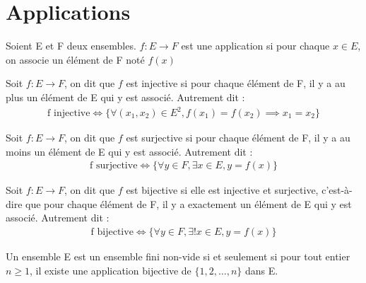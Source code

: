\section{Applications}
\begin{definitionbox}
    \begin{definition}[Application]
	Soient E et F deux ensembles. $f:E \to F$ est une application si pour chaque $x \in E$, on associe un élément de F noté $f(x)$
\end{definition}
\end{definitionbox}

\begin{definitionbox}
    \begin{definition}[Injectivité]
	Soit $f:E \to F$, on dit que $f$ est injective si pour chaque élément de F, il y a au plus un élément de E qui y est associé. Autrement dit :
	\begin{align*}
		\text{f injective} \iff \{\forall (x_1, x_2) \in E^2, f(x_1) = f(x_2) \implies x_1 = x_2\}
	\end{align*}
\end{definition}
\end{definitionbox}

\begin{definitionbox}
    \begin{definition}[Surjectivité]
	Soit $f:E \to F$, on dit que $f$ est surjective si pour chaque élément de F, il y a au moins un élément de E qui y est associé.
	Autrement dit :
	\begin{align*}
		\text{f surjective} \iff \{\forall y \in F, \exists x \in E, y = f(x)\}
	\end{align*}
\end{definition}
\end{definitionbox}

\begin{definitionbox}
    \begin{definition}[Bijectivité]
	Soit $f:E \to F$, on dit que $f$ est bijective si elle est injective et surjective, c'est-à-dire que pour chaque élément de F, il y a exactement un élément de E qui y est associé.
	Autrement dit :
	\begin{align*}
		\text{f bijective} \iff \{\forall y \in F, \exists! x \in E, y = f(x)\}
	\end{align*}
\end{definition}
\end{definitionbox}

\begin{definitionbox}
    \begin{definition}
    Un ensemble E est un ensemble fini non-vide si et seulement si pour tout entier $n \geq 1$, il existe une application bijective de $\{1, 2, \ldots, n\}$ dans E.
\end{definition}
\end{definitionbox}

